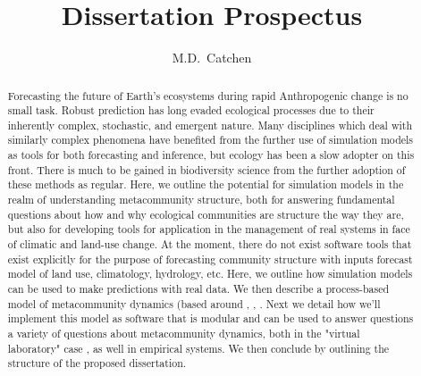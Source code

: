 \documentclass[]{article}
\title{Dissertation Prospectus}
\author{M.D.~Catchen}
\date{}
\begin{document}
\maketitle
\begin{abstract}
Forecasting the future of Earth's ecosystems during rapid Anthropogenic change is no small task.
Robust prediction has long evaded ecological processes due to their inherently complex, stochastic, and emergent nature.
Many disciplines which deal with similarly complex phenomena have benefited from the further use of simulation models as tools for both forecasting and inference, but ecology has been a slow adopter on this front.
There is much to be gained in biodiversity science from the further adoption of these methods as regular.
Here, we outline the potential for simulation models in the realm of understanding metacommunity structure, both for answering fundamental questions about how and why ecological communities are structure the way they are, but also for developing tools for application in the management of real systems in face of climatic and land-use change.
At the moment, there do not exist software tools that exist explicitly for the purpose of forecasting community structure with inputs forecast model of land use, climatology, hydrology, etc.
Here, we outline how simulation models can be used to make predictions with real data.
We then describe a process-based model of metacommunity dynamics (based around \citep{velland_2010}, \citep{poisot_2020}, \citep{thompson_2020}.
Next we detail how we'll implement this model as software that is modular and can be used to answer questions a variety of questions about metacommunity dynamics, both in the "virtual laboratory" case \citep{ibm_book}, as well in empirical systems.
We then conclude by outlining the structure of the proposed dissertation.
\end{abstract}

\pagebreak
\end{document}
